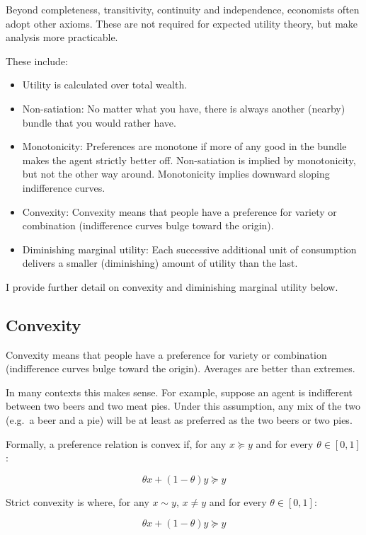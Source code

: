 \documentclass[
  letterpaper,
  DIV=11,
  numbers=noendperiod]{scrreprt}
\begin{document}
Beyond completeness, transitivity, continuity and independence,
economists often adopt other axioms. These are not required for expected
utility theory, but make analysis more practicable.

These include:

\begin{itemize}
\item
  Utility is calculated over total wealth.
\item
  Non-satiation: No matter what you have, there is always another
  (nearby) bundle that you would rather have.
\item
  Monotonicity: Preferences are monotone if more of any good in the
  bundle makes the agent strictly better off. Non-satiation is implied
  by monotonicity, but not the other way around. Monotonicity implies
  downward sloping indifference curves.
\item
  Convexity: Convexity means that people have a preference for variety
  or combination (indifference curves bulge toward the origin).
\item
  Diminishing marginal utility: Each successive additional unit of
  consumption delivers a smaller (diminishing) amount of utility than
  the last.
\end{itemize}

I provide further detail on convexity and diminishing marginal utility
below.

\hypertarget{convexity}{%
\subsection{Convexity}\label{convexity}}

Convexity means that people have a preference for variety or combination
(indifference curves bulge toward the origin). Averages are better than
extremes.

In many contexts this makes sense. For example, suppose an agent is
indifferent between two beers and two meat pies. Under this assumption,
any mix of the two (e.g.~a beer and a pie) will be at least as preferred
as the two beers or two pies.

Formally, a preference relation is convex if, for any
\(x\succcurlyeq y\) and for every \(\theta\in[0,1]\):

\[\theta x+(1-\theta)y\succcurlyeq y\]

Strict convexity is where, for any \(x\sim y\), \(x\neq y\) and for
every \(\theta\in[0,1]\):

\[\theta x+(1-\theta)y\succcurlyeq y\]
\end{document}
